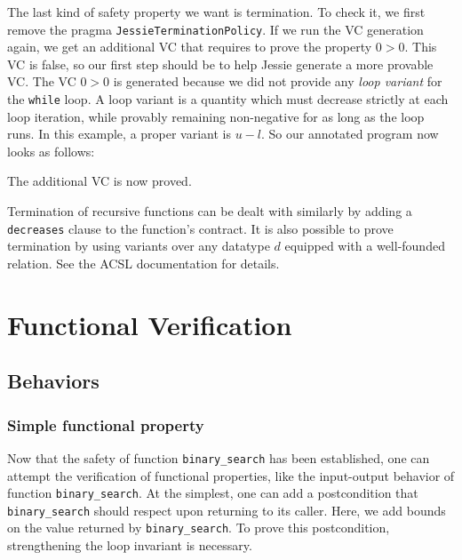 \documentclass[a4paper,11pt,twoside,openright]{report}
\begin{document}
The last kind of safety property we want is termination. To check it,
we first remove the pragma \texttt{JessieTerminationPolicy}. If we run
the VC generation again, we get an additional VC that requires to prove
the property $0 > 0$. This VC is false, so our first step should be
to help Jessie generate a more provable VC.
The VC $0 > 0$ is generated because we did not provide any
\emph{loop variant} for the \texttt{while} loop. A loop variant is a
quantity which must decrease strictly at each loop iteration, while
provably remaining non-negative for as long as the loop runs. 
In this example, a proper variant is $u-l$. 
So our annotated program now looks as follows:



The additional VC is now proved.

Termination of recursive functions can be dealt with similarly by
adding a \texttt{decreases} clause to the function's contract. 
It is also possible to prove termination by using variants over 
any datatype $d$ equipped with a well-founded relation. 
See the ACSL documentation for details.




\chapter{Functional Verification}


\section{Behaviors}

\subsection{Simple functional property}

Now that the safety of function \verb|binary_search| has been established, one
can attempt the verification of functional properties, like the
input-output behavior of function \verb|binary_search|. At the
simplest, one can add a postcondition that \verb|binary_search| should
respect upon returning to its caller. Here, we add bounds on the value
returned by \verb|binary_search|. To prove this postcondition,
strengthening the loop invariant is necessary.
\end{document}
